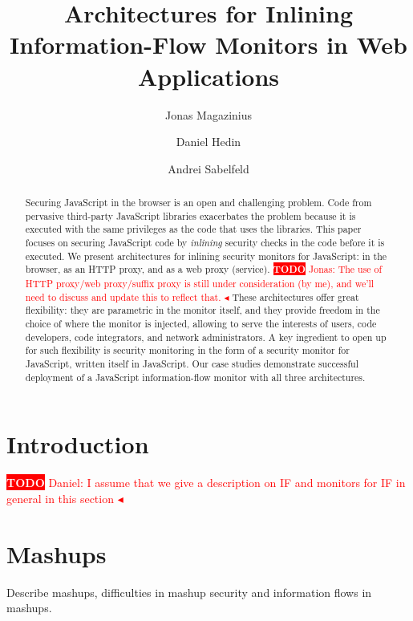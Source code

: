 \documentclass{llncs}
\title{Architectures for Inlining Information-Flow Monitors in Web Applications}
\author{Jonas Magazinius \and Daniel Hedin \and Andrei Sabelfeld}
\institute{Chalmers University of Technology, Gothenburg, Sweden}
\newcommand{\todo}[1]{\colorbox{red}{\textcolor{white}{\sffamily\bfseries\scriptsize TODO}} \textcolor{red}{#1} \textcolor{red}{$\blacktriangleleft$}}
\begin{document}
\maketitle



\begin{abstract}
Securing JavaScript in the browser is an open and challenging
problem. Code from pervasive third-party JavaScript libraries exacerbates the
problem because it is executed with the same privileges as the code
that uses the libraries.
%
This paper focuses on securing JavaScript code by \emph{inlining}
security checks in the code before it is executed. We present
architectures for inlining security monitors for JavaScript: in
the browser, as an HTTP proxy, and as a web proxy (service). 
%
\todo{Jonas: The use of HTTP proxy/web proxy/suffix proxy is still under consideration (by me), and we'll need to discuss and update this to reflect that.}
%
These architectures offer great flexibility: they are parametric in the monitor itself,
and they provide freedom in the choice of where the monitor is
injected, allowing to serve the interests of users, code developers, code
integrators, and network administrators.
%
A key ingredient to open up for such flexibility is security monitoring in the form of a
security monitor for JavaScript, written itself in JavaScript.
%
Our case studies demonstrate successful deployment of a JavaScript
information-flow monitor with all three architectures.
\end{abstract}










\section{Introduction}
\label{sec:intro}

\todo{Daniel: I assume that we give a description on IF and monitors for IF in general in this section}

\section{Mashups}
\label{sec:mash}

Describe mashups, difficulties in mashup security and information flows in mashups.
\end{document}
